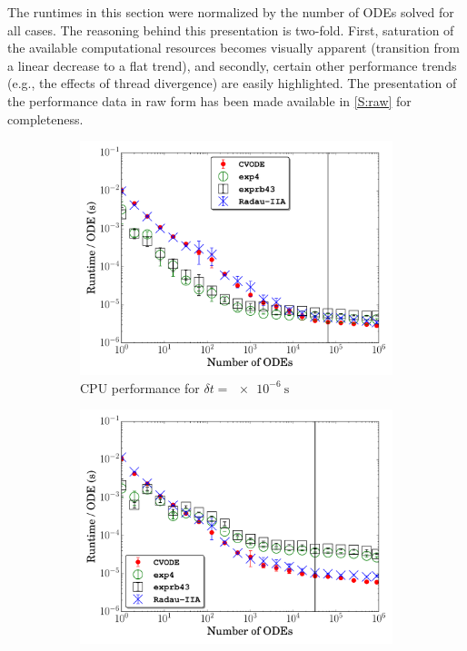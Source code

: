 \documentclass[final,twocolumn]{elsarticle}
\begin{document}
The runtimes in this section were normalized by the number of ODEs solved for all cases.
The reasoning behind this presentation is two-fold.
First, saturation of the available computational resources becomes visually apparent (transition from a linear decrease to a flat trend), and secondly, certain other performance trends (e.g., the effects of thread divergence) are easily highlighted.
The presentation of the performance data in raw form has been made available in \ref{S:raw} for completeness.

\begin{figure}[htb]
  \ifmeasure
  \fontsize{8pt}{10pt}\selectfont
  \fi
  \centering
  \begin{subfigure}{0.49\textwidth}
      \includegraphics[width=\linewidth]{H2_1e-06_cpu.pdf}
      \caption{CPU performance for $\delta t = \SI{e-6}{\second}$}
      \label{F:h2_cpu_perf_small}
  \end{subfigure}
  \begin{subfigure}{0.49\textwidth}
      \includegraphics[width=\linewidth]{H2_1e-04_cpu.pdf}

\end{subfigure}
\end{figure}
\end{document}
